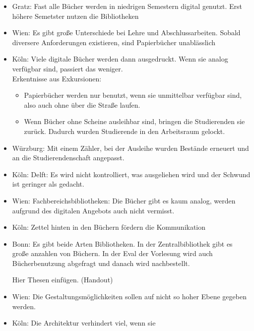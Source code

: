     \begin{itemize}
      \item Gratz: Fast alle Bücher werden in niedrigen Semestern digital genutzt. Erst höhere Semetster nutzen die Bibliotheken

      \item Wien: Es gibt große Unterschiede bei Lehre und Abschlussarbeiten. Sobald diversere Anforderungen existieren, sind Papierbücher unablässlich

      \item Köln: Viele digitale Bücher werden dann ausgedruckt. Wenn sie analog verfügbar sind, passiert das weniger. \\
      Erkentnisse aus Exkursionen:
      \begin{itemize}
        \item Papierbücher werden nur benutzt, wenn sie unmittelbar verfügbar sind, also auch ohne über die Straße laufen.
        \item Wenn Bücher ohne Scheine ausleihbar sind, bringen die Studierenden sie zurück. Dadurch wurden Studierende in den Arbeitsraum gelockt.
      \end{itemize}

      \item Würzburg: Mit einem Zähler, bei der Ausleihe wurden Bestände erneuert und an die Studierendenschaft angepasst.

      \item Köln: Delft: Es wird nicht kontrolliert, was ausgeliehen wird und der Schwund ist geringer als gedacht.

      \item Wien: Fachbereichsbibliotheken: Die Bücher gibt es kaum analog, werden aufgrund des digitalen Angebots auch nicht vermisst.

      \item Köln: Zettel hinten in den Büchern fördern die Kommunikation

      \item Bonn: Es gibt beide Arten Bibliotheken. In der Zentralbibliothek gibt es große anzahlen von Büchern. In der Eval der Vorlesung wird auch Bücherbenutzung abgefragt und danach wird nachbestellt.

          Hier Thesen einfügen. (Handout)

      \item Wien: Die Gestaltungsmöglichkeiten sollen auf nicht so hoher Ebene gegeben werden.

      \item Köln: Die Architektur verhindert viel, wenn sie


\end{itemize}
